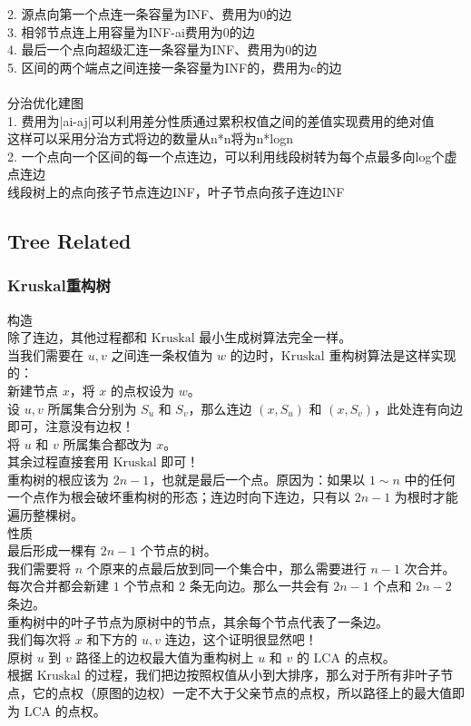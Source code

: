 \documentclass[10pt]{ctexart}
\begin{document}
{2. 源点向第一个点连一条容量为INF、费用为0的边\\
3. 相邻节点连上用容量为INF-ai费用为0的边\\
4. 最后一个点向超级汇连一条容量为INF、费用为0的边\\
5. 区间的两个端点之间连接一条容量为INF的，费用为c的边\\
\\
分治优化建图\\
1. 费用为|ai-aj|可以利用差分性质通过累积权值之间的差值实现费用的绝对值\\
这样可以采用分治方式将边的数量从n*n将为n*logn\\
2. 一个点向一个区间的每一个点连边，可以利用线段树转为每个点最多向log个虚点连边\\
线段树上的点向孩子节点连边{INF}，叶子节点向孩子连边{INF}
\subsection{Tree Related}
\subsubsection{Kruskal重构树}
构造\\

除了连边，其他过程都和 $\text{Kruskal}$ 最小生成树算法完全一样。\\
当我们需要在 $u,v$ 之间连一条权值为 $w$ 的边时，$\text{Kruskal}$ 重构树算法是这样实现的：\\
新建节点 $x$，将 $x$ 的点权设为 $w$。\\
设 $u,v$ 所属集合分别为 $S_u$ 和 $S_v$，那么连边 $(x,S_u)$ 和 $(x,S_v)$，此处连有向边即可，注意没有边权！\\
将 $u$ 和 $v$ 所属集合都改为 $x$。\\
其余过程直接套用 $\text{Kruskal}$ 即可！\\
重构树的根应该为 $2n-1$，也就是最后一个点。原因为：如果以 $1\sim n$ 中的任何一个点作为根会破坏重构树的形态；连边时向下连边，只有以 $2n-1$ 为根时才能遍历整棵树。\\

性质\\

最后形成一棵有 $2n-1$ 个节点的树。\\
我们需要将 $n$ 个原来的点最后放到同一个集合中，那么需要进行 $n-1$ 次合并。每次合并都会新建 $1$ 个节点和 $2$ 条无向边。那么一共会有 $2n-1$ 个点和 $2n-2$ 条边。\\
重构树中的叶子节点为原树中的节点，其余每个节点代表了一条边。\\
我们每次将 $x$ 和下方的 $u,v$ 连边，这个证明很显然吧！\\
原树 $u$ 到 $v$ 路径上的边权最大值为重构树上 $u$ 和 $v$ 的 $\text{LCA}$ 的点权。\\
根据 $\text{Kruskal}$ 的过程，我们把边按照权值从小到大排序，那么对于所有非叶子节点，它的点权（原图的边权）一定不大于父亲节点的点权，所以路径上的最大值即为 $\text{LCA}$ 的点权。\\

}
\end{document}
